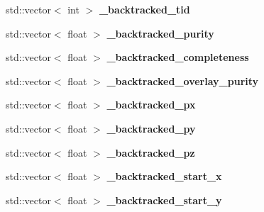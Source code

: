 \begin{DoxyCompactItemize}
\item 
std\+::vector$<$ int $>$ {\bfseries \+\_\+backtracked\+\_\+tid}\hypertarget{classanalysis_1_1DefaultAnalysis_ae0d78cb44e21f5f0e73bd1fe85eec1c6}{}\label{classanalysis_1_1DefaultAnalysis_ae0d78cb44e21f5f0e73bd1fe85eec1c6}

\item 
std\+::vector$<$ float $>$ {\bfseries \+\_\+backtracked\+\_\+purity}\hypertarget{classanalysis_1_1DefaultAnalysis_ad08d9b30c434685e350c5f292d4df08b}{}\label{classanalysis_1_1DefaultAnalysis_ad08d9b30c434685e350c5f292d4df08b}

\item 
std\+::vector$<$ float $>$ {\bfseries \+\_\+backtracked\+\_\+completeness}\hypertarget{classanalysis_1_1DefaultAnalysis_a60ef3ec6e332c118c088e0203fb858d6}{}\label{classanalysis_1_1DefaultAnalysis_a60ef3ec6e332c118c088e0203fb858d6}

\item 
std\+::vector$<$ float $>$ {\bfseries \+\_\+backtracked\+\_\+overlay\+\_\+purity}\hypertarget{classanalysis_1_1DefaultAnalysis_a29bf0fc0be5e2beffdacad2ff2e2285e}{}\label{classanalysis_1_1DefaultAnalysis_a29bf0fc0be5e2beffdacad2ff2e2285e}

\item 
std\+::vector$<$ float $>$ {\bfseries \+\_\+backtracked\+\_\+px}\hypertarget{classanalysis_1_1DefaultAnalysis_a047ee0f1b72f5335030480bc685dea5a}{}\label{classanalysis_1_1DefaultAnalysis_a047ee0f1b72f5335030480bc685dea5a}

\item 
std\+::vector$<$ float $>$ {\bfseries \+\_\+backtracked\+\_\+py}\hypertarget{classanalysis_1_1DefaultAnalysis_a40680f9d1dbeba13fc5064ad92641412}{}\label{classanalysis_1_1DefaultAnalysis_a40680f9d1dbeba13fc5064ad92641412}

\item 
std\+::vector$<$ float $>$ {\bfseries \+\_\+backtracked\+\_\+pz}\hypertarget{classanalysis_1_1DefaultAnalysis_a60378effd0cfb18d7ef31a02685c3e47}{}\label{classanalysis_1_1DefaultAnalysis_a60378effd0cfb18d7ef31a02685c3e47}

\item 
std\+::vector$<$ float $>$ {\bfseries \+\_\+backtracked\+\_\+start\+\_\+x}\hypertarget{classanalysis_1_1DefaultAnalysis_a3b1f942ad3903e2af60ec228dcf40562}{}\label{classanalysis_1_1DefaultAnalysis_a3b1f942ad3903e2af60ec228dcf40562}

\item 
std\+::vector$<$ float $>$ {\bfseries \+\_\+backtracked\+\_\+start\+\_\+y}\hypertarget{classanalysis_1_1DefaultAnalysis_ad70732ed1e83c9a482c76e0d527d8d5e}{}\label{classanalysis_1_1DefaultAnalysis_ad70732ed1e83c9a482c76e0d527d8d5e}


\end{DoxyCompactItemize}
